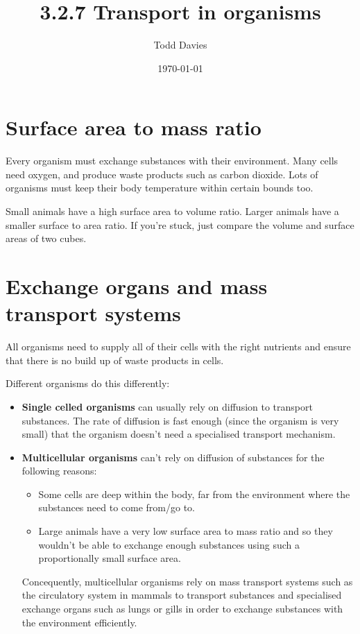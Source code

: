 \documentclass{article}
\author{Todd Davies}
\title{3.2.7 Transport in organisms}
\date{\today}
\begin{document}
\lhead{\today}

\maketitle

\section*{Surface area to mass ratio}
\thispagestyle{empty}

Every organism must exchange substances with their environment. Many cells need
oxygen, and produce waste products such as carbon dioxide. Lots of organisms
must keep their body temperature within certain bounds too.

Small animals have a high surface area to volume ratio. Larger animals have a
smaller surface to area ratio. If you're stuck, just compare the volume and
surface areas of two cubes.

\section*{Exchange organs and mass transport systems}

All organisms need to supply all of their cells with the right
nutrients and ensure that there is no build up of waste products in cells.

Different organisms do this differently:

\begin{itemize}

	\item {\bf Single celled organisms} can usually rely on diffusion to
	transport substances. The rate of diffusion is fast enough (since the
	organism is very small) that the organism doesn't need a specialised
	transport mechanism.

	\item {\bf Multicellular organisms} can't rely on diffusion of substances
	for the following reasons:

		\begin{itemize}

			\item Some cells are deep within the body, far from the environment
			where the substances need to come from/go to.

			\item Large animals have a very low surface area to mass ratio and
			so they wouldn't be able to exchange enough substances using such a
			proportionally small surface area.

		\end{itemize}

	Concequently, multicellular organisms rely on mass transport systems such as
	the circulatory system in mammals to transport substances and specialised
	exchange organs such as lungs or gills in order to exchange substances with
	the environment efficiently.

\end{itemize}
\end{document}
